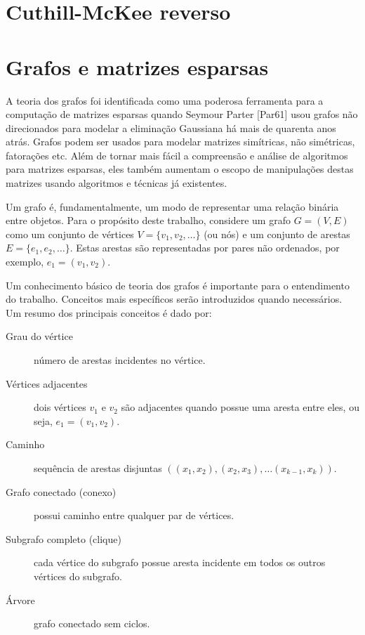 % 
% 
% 
% 
% 
%
\section{Cuthill-McKee reverso}
\section{Grafos e matrizes esparsas}
A teoria dos grafos foi identificada como uma poderosa ferramenta para a computação de matrizes esparsas quando Seymour Parter [Par61] usou grafos não direcionados para modelar a eliminação Gaussiana há mais de quarenta anos atrás. Grafos podem ser usados para modelar matrizes simítricas, não simétricas, fatorações etc. Além de tornar mais fácil a compreensão e análise de algoritmos para matrizes esparsas, eles também aumentam o escopo de manipulações destas matrizes usando algoritmos e técnicas já existentes.

Um grafo é, fundamentalmente, um modo de representar uma relação binária entre objetos. Para o propósito deste trabalho, considere um grafo $G = (V, E)$ como um conjunto de vértices $V = \{v_1, v_2, \ldots \}$ (ou nós) e um conjunto de arestas $E = \{e_1, e_2, \ldots \}$. Estas arestas são representadas por pares não ordenados, por exemplo, $e_1 = (v_1 , v_2)$.

Um conhecimento básico de teoria dos grafos é importante para o entendimento do trabalho. Conceitos mais específicos serão introduzidos quando necessários. Um resumo dos principais conceitos é dado por:
\begin{description}
    \item[Grau do vértice] número de arestas incidentes no vértice.
    \item[Vértices adjacentes]  dois vértices $v_1$ e $v_2$ são adjacentes quando possue uma aresta entre eles, ou seja, $e_1 = (v_1, v_2)$.
    \item[Caminho] sequência de arestas disjuntas $\left( (x_1, x_2), (x_2, x_3), \ldots (x_{k - 1}, x_k) \right)$.
    \item[Grafo conectado (conexo)] possui caminho entre qualquer par de vértices.
    \item[Subgrafo completo (clique)] cada vértice do subgrafo possue aresta incidente em todos os outros vértices do subgrafo.
    \item[Árvore] grafo conectado sem ciclos.
\end{description}

